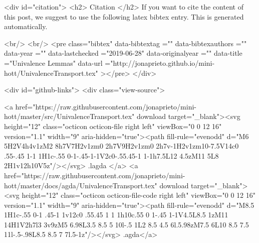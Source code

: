   
  <div id="citation">
  <h2> Citation </h2>
  If you want to cite the content of this post,
  we suggest to use the following latex bibtex entry.
  This is generated automatically.

  <br/>
  <br/>
  <pre class="bibtex"
       data-bibtextag =""
       data-bibtexauthors =""
       data-year =""
       data-lastchecked ="2019-06-28"
       data-originalyear =""
       data-title ="Univalence Lemmas"
       data-url ="http://jonaprieto.github.io/mini-hott/UnivalenceTransport.tex"
  ></pre>
  </div>
  

  <div id="github-links">
    <div class="view-source">
      
        <a href="https://raw.githubusercontent.com/jonaprieto/mini-hott/master/src/UnivalenceTransport.tex" download target="_blank"><svg height="12" class="octicon octicon-file right left" viewBox="0 0 12 16" version="1.1" width="9" aria-hidden="true"><path fill-rule="evenodd" d="M6 5H2V4h4v1zM2 8h7V7H2v1zm0 2h7V9H2v1zm0 2h7v-1H2v1zm10-7.5V14c0 .55-.45 1-1 1H1c-.55 0-1-.45-1-1V2c0-.55.45-1 1-1h7.5L12 4.5zM11 5L8 2H1v12h10V5z"/></svg> .lagda </a>
        <a href="https://raw.githubusercontent.com/jonaprieto/mini-hott/master/docs/agda/UnivalenceTransport.tex" download target="_blank"><svg height="12" class="octicon octicon-file-code right left" viewBox="0 0 12 16" version="1.1" width="9" aria-hidden="true"><path fill-rule="evenodd" d="M8.5 1H1c-.55 0-1 .45-1 1v12c0 .55.45 1 1 1h10c.55 0 1-.45 1-1V4.5L8.5 1zM11 14H1V2h7l3 3v9zM5 6.98L3.5 8.5 5 10l-.5 1L2 8.5 4.5 6l.5.98zM7.5 6L10 8.5 7.5 11l-.5-.98L8.5 8.5 7 7l.5-1z"/></svg> .agda</a>
      
